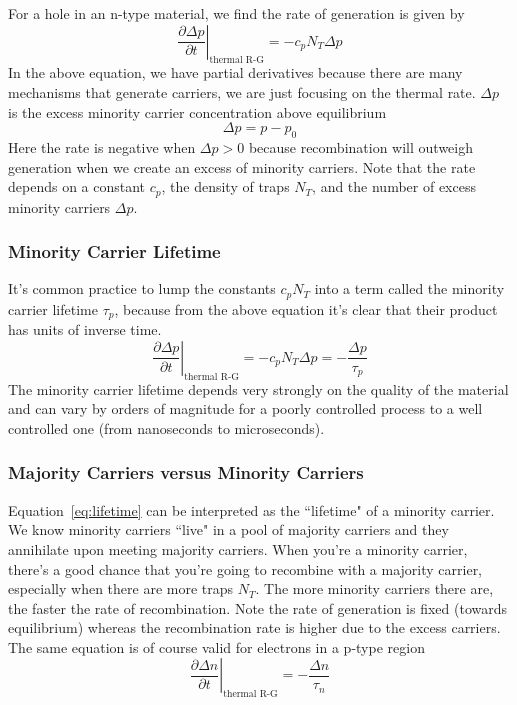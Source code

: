 For a hole in an n-type material, we find the rate of generation is given by
\begin{equation}
	\left. \frac{\partial \Delta p}{\partial t} \right|_{\text{thermal R-G}} = - c_p N_T \Delta p
\end{equation}
% 
In the above equation, we have partial derivatives because there are many mechanisms that generate carriers, we are just focusing on the thermal rate.  $\Delta p$ is the excess minority carrier concentration above equilibrium
\begin{equation}
	\Delta p = p - p_0
\end{equation}
%
Here the rate is negative when $\Delta p > 0$ because recombination will outweigh generation when we create an excess of minority carriers.  Note that the rate depends on a constant $c_p$, the density of traps $N_T$, and the number of excess minority carriers $\Delta p$.  
 

\subsubsection*{Minority Carrier Lifetime}


It's common practice to lump the constants $c_p N_T$ into a term called the minority carrier lifetime $\tau_p$, because from the above equation it's clear that their product has units of inverse time.
 \begin{equation}
	\left. \frac{\partial \Delta p}{\partial t} \right|_{\text{thermal R-G}} = - c_p N_T \Delta p = - \frac{\Delta p}{\tau_p}
	\label{eq:lifetime}
\end{equation} 
The minority carrier lifetime depends very strongly on the quality of the material and can vary by orders of magnitude for a poorly controlled process to a well controlled one (from nanoseconds to microseconds).
 

\subsubsection*{Majority Carriers versus Minority Carriers}


Equation~\ref{eq:lifetime} can be interpreted as the ``lifetime" of a minority carrier.  We know minority carriers ``live" in a pool of majority carriers and they annihilate upon meeting majority carriers.  When you're a minority carrier, there's a good chance that you're going to recombine with a majority carrier, especially when there are more traps $N_T$.  The more minority carriers there are, the faster the rate of recombination.  Note the rate of generation is fixed (towards equilibrium) whereas the recombination rate is higher due to the excess carriers.  The same equation is of course valid for electrons in a p-type region
\begin{equation}
	\left. \frac{\partial \Delta n}{\partial t} \right|_{\text{thermal R-G}} = - \frac{\Delta n}{\tau_n}
\end{equation}


